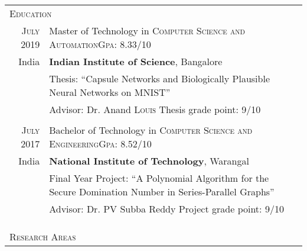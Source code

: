 \documentclass[a4paper,10pt]{article}
\begin{document}
\bigskip
\begin{tabularx}{\textwidth}{r|X}

\multicolumn{2}{l}{\LARGE{\textsc{Education}}}\\[2ex]

 \textsc{July} 2019 & Master of Technology in \textsc{Computer Science and Automation}\hfill \textsc{Gpa}: 8.33/10\\
India&  \textbf{Indian Institute of Science}, Bangalore\\
& Thesis: ``Capsule Networks and Biologically Plausible Neural Networks on MNIST'' \\ 
& Advisor: Dr. Anand \textsc{Louis} \hfill Thesis grade point: \textsc{9/10}\\
\multicolumn{2}{c}{} \\
\textsc{July} 2017& Bachelor of Technology in \textsc{Computer Science and Engineering}\hfill \textsc{Gpa}: 8.52/10\\India&\textbf{National Institute of Technology}, Warangal\\
& Final Year Project: ``A Polynomial Algorithm for the Secure Domination Number in Series-Parallel Graphs'' \\ 
& Advisor: Dr. PV Subba Reddy \hfill Project grade point: \textsc{9/10}\\
\multicolumn{2}{c}{} \\
\multicolumn{2}{c}{}\\
\hline
\multicolumn{2}{c}{} \\









\multicolumn{2}{l}{\LARGE{\textsc{Research Areas}}}\\[2ex]


\end{tabularx}
\end{document}
